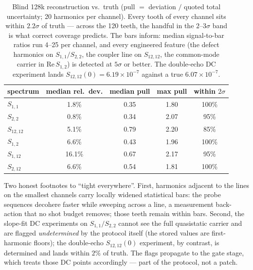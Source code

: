 \documentclass[10pt]{article}
\begin{document}
\begin{table}[h!]
\centering\small
\begin{tabular}{lcccc}
\toprule
spectrum & median rel.\ dev. & median pull & max pull & within $2\sigma$ \\
\midrule
$S_{1,1}$    & 1.8\% & 0.35 & 1.80 & 100\% \\
$S_{2,2}$    & 0.8\% & 0.34 & 2.07 & 95\% \\
$S_{12,12}$  & 5.1\% & 0.79 & 2.20 & 85\% \\
$S_{1,2}$    & 6.6\% & 0.43 & 1.96 & 100\% \\
$S_{1,12}$   & 16.1\% & 0.67 & 2.17 & 95\% \\
$S_{2,12}$   & 6.6\% & 0.54 & 1.81 & 100\% \\
\bottomrule
\end{tabular}
\caption{Blind 128k reconstruction vs.\ truth (pull $=$ deviation $/$ quoted
total uncertainty; 20 harmonics per channel). Every tooth of every channel
sits within $2.2\sigma$ of truth --- across the 120 teeth, the handful in
the $2$--$3\sigma$ band is what correct coverage predicts. The bars inform:
median signal-to-bar ratios run 4--25 per channel, and every engineered
feature (the defect harmonics on $S_{1,1}/S_{2,2}$, the coupler line on
$S_{12,12}$, the common-mode carrier in $\mathrm{Re}\,S_{1,2}$) is detected
at $5\sigma$ or better. The double-echo DC experiment lands
$S_{12,12}(0) = 6.19\times10^{-7}$ against a true $6.07\times10^{-7}$.}
\label{tab:recon}
\end{table}

Two honest footnotes to ``tight everywhere''. First, harmonics adjacent to
the lines on the smallest channels carry locally widened statistical bars:
the probe sequences decohere faster while sweeping across a line, a
measurement back-action that no shot budget removes; those teeth remain
within bars. Second, the slope-fit DC experiments on $S_{1,1}/S_{2,2}$
cannot see the full quasistatic carrier and are flagged \emph{undetermined}
by the protocol itself (the stored values are first-harmonic floors); the
double-echo $S_{12,12}(0)$ experiment, by contrast, is determined and lands
within $2\%$ of truth. The flags propagate to the gate stage, which treats
those DC points accordingly --- part of the protocol, not a patch.
\end{document}
